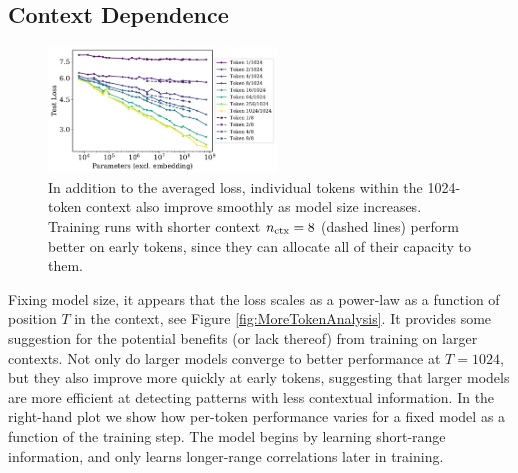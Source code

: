 \documentclass[english]{article}
\begin{document}
\subsection{Context Dependence}
\label{sec:ContextDependence}

\begin{figure}
\noindent \centering{}  \includegraphics[width=0.54\textwidth]{PerformancevsModelSizevsContext}  \caption[Performance at different context positions versus model size]{In addition to the averaged loss, individual tokens within the 1024-token context also improve smoothly as model size increases.  Training runs with shorter context $n_{\rm ctx} = 8$ (dashed lines) perform better on early tokens, since they can allocate all of their capacity to them.  \label{fig:PerformancevsModelSizevsContext}}
\end{figure}

Fixing model size, it appears that the loss scales as a power-law as a function of position $T$ in the context, see Figure \ref{fig:MoreTokenAnalysis}.  It provides some suggestion for the potential benefits (or lack thereof) from training on larger contexts.  Not only do larger models converge to better performance at $T=1024$, but they also improve more quickly at early tokens, suggesting that larger models are more efficient at detecting patterns with less contextual information.  In the right-hand plot we show how per-token performance varies for a fixed model as a function of the training step.  The model begins by learning short-range information, and only learns longer-range correlations later in training.
\end{document}
